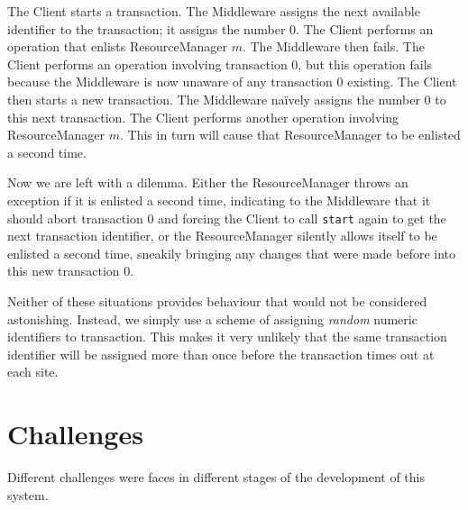\documentclass[letterpaper,11pt]{article}
\begin{document}
The Client starts a transaction. The Middleware assigns the next available
identifier to the transaction; it assigns the number $0$. The Client performs
an operation that enlists ResourceManager $m$. The Middleware then fails. The
Client performs an operation involving transaction $0$, but this operation
fails because the Middleware is now unaware of any transaction $0$ existing.
The Client then starts a new transaction. The Middleware na\"ively assigns
the number $0$ to this next transaction. The Client performs another operation
involving ResourceManager $m$. This in turn will cause that ResourceManager to
be enlisted a second time.

Now we are left with a dilemma. Either the ResourceManager throws an exception
if it is enlisted a second time, indicating to the Middleware that it should
abort transaction $0$ and forcing the Client to call \texttt{start} again to
get the next transaction identifier, or the ResourceManager silently allows
itself to be enlisted a second time, sneakily bringing any changes that were
made before into this new transaction $0$.

Neither of these situations provides behaviour that would not be considered
astonishing. Instead, we simply use a scheme of assigning \emph{random} numeric
identifiers to transaction. This makes it very unlikely that the same
transaction identifier will be assigned more than once before the transaction
times out at each site.

\section{Challenges}

Different challenges were faces in different stages of the development of this
system.
\end{document}
